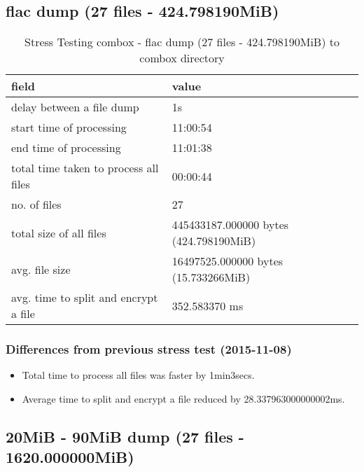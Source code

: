 \subsection{flac dump (27 files - 424.798190MiB)}\label{4-st-424}

\begin{center}
\begin{table}[h]
\begin{tabular}{ll}
field & value\\
\hline
delay between a file dump & 1s\\
start time of processing & 11:00:54\\
end time of processing & 11:01:38\\
total time taken to process all files & 00:00:44\\
no. of files & 27\\
total size of all files & 445433187.000000 bytes (424.798190MiB)\\
avg. file size & 16497525.000000 bytes (15.733266MiB)\\
avg. time to split and encrypt a file & 352.583370 ms\\
\end{tabular}
\caption{Stress Testing combox - flac dump (27 files - 424.798190MiB) to combox directory}
\end{table}
\end{center}

\subsubsection{Differences from previous stress test (2015-11-08)}

\begin{itemize}
\item Total time to process all files was faster by 1min3secs.
\item Average time to split and encrypt a file reduced by
  28.337963000000002ms.
\end{itemize}

\subsection{20MiB - 90MiB dump (27 files - 1620.000000MiB)}\label{4-st-1620}

